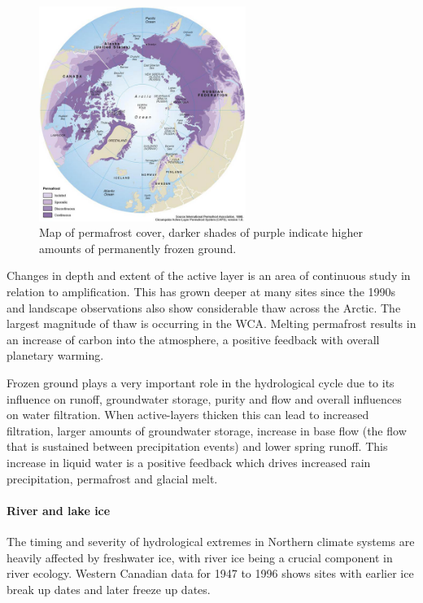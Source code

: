 \documentclass[12pt, oneside]{article}
\begin{document}
\begin{figure}[h!]
\centering
\includegraphics[width=0.6\textwidth]{figures/permafrost-arctic-distribution.png}
\caption{Map of permafrost cover, darker shades of purple indicate higher amounts of permanently frozen ground. \cite{perm_map}}\label{fig:perm}
\end{figure}



Changes in depth and extent of the active layer is an area of continuous study in relation to amplification. This has grown deeper at many sites since the 1990s and landscape observations also show considerable thaw across the Arctic. The largest magnitude of thaw is occurring in the WCA. Melting permafrost results in an increase of carbon into the atmosphere, a positive feedback with overall planetary warming.  


Frozen ground plays a very important role in the hydrological cycle due to its influence on runoff, groundwater storage, purity and flow and overall influences on water filtration. When active-layers thicken this can lead to 
increased filtration, larger amounts of groundwater storage, increase in base flow (the flow that is sustained between precipitation events) and lower spring runoff. This increase in liquid water is a positive feedback which drives increased rain precipitation, permafrost and glacial melt. 

\paragraph{River and lake ice}
The timing and severity of hydrological extremes in Northern climate systems are heavily affected by freshwater ice, with river ice being a crucial component in river ecology. Western Canadian data for 1947 to 1996 shows sites with earlier ice break up dates and later freeze up dates. 
\end{document}
